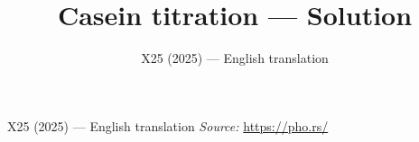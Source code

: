 \documentclass[11pt,a4paper]{article}
\title{\textbf{Casein titration --- Solution}}
\author{\normalsize X25 (2025) — English translation}
\date{}
\begin{document}
\maketitle
X25 (2025) — English translation
\vspace{1em}
\noindent\textit{Source:} \url{https://pho.rs/}
\end{document}
